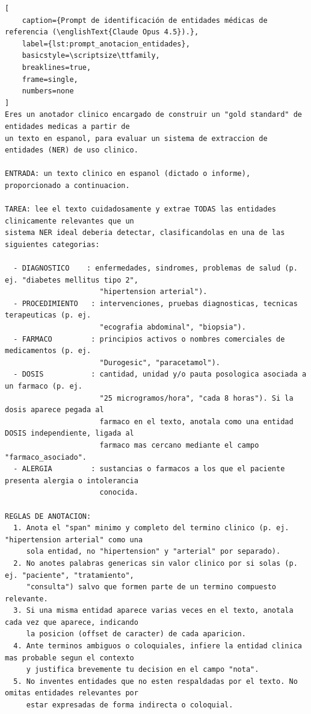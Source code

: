 \begin{lstlisting}[
    caption={Prompt de identificación de entidades médicas de referencia (\englishText{Claude Opus 4.5}).},
    label={lst:prompt_anotacion_entidades},
    basicstyle=\scriptsize\ttfamily,
    breaklines=true,
    frame=single,
    numbers=none
]
Eres un anotador clinico encargado de construir un "gold standard" de entidades medicas a partir de
un texto en espanol, para evaluar un sistema de extraccion de entidades (NER) de uso clinico.

ENTRADA: un texto clinico en espanol (dictado o informe), proporcionado a continuacion.

TAREA: lee el texto cuidadosamente y extrae TODAS las entidades clinicamente relevantes que un
sistema NER ideal deberia detectar, clasificandolas en una de las siguientes categorias:

  - DIAGNOSTICO    : enfermedades, sindromes, problemas de salud (p. ej. "diabetes mellitus tipo 2",
                      "hipertension arterial").
  - PROCEDIMIENTO   : intervenciones, pruebas diagnosticas, tecnicas terapeuticas (p. ej.
                      "ecografia abdominal", "biopsia").
  - FARMACO         : principios activos o nombres comerciales de medicamentos (p. ej.
                      "Durogesic", "paracetamol").
  - DOSIS           : cantidad, unidad y/o pauta posologica asociada a un farmaco (p. ej.
                      "25 microgramos/hora", "cada 8 horas"). Si la dosis aparece pegada al
                      farmaco en el texto, anotala como una entidad DOSIS independiente, ligada al
                      farmaco mas cercano mediante el campo "farmaco_asociado".
  - ALERGIA         : sustancias o farmacos a los que el paciente presenta alergia o intolerancia
                      conocida.

REGLAS DE ANOTACION:
  1. Anota el "span" minimo y completo del termino clinico (p. ej. "hipertension arterial" como una
     sola entidad, no "hipertension" y "arterial" por separado).
  2. No anotes palabras genericas sin valor clinico por si solas (p. ej. "paciente", "tratamiento",
     "consulta") salvo que formen parte de un termino compuesto relevante.
  3. Si una misma entidad aparece varias veces en el texto, anotala cada vez que aparece, indicando
     la posicion (offset de caracter) de cada aparicion.
  4. Ante terminos ambiguos o coloquiales, infiere la entidad clinica mas probable segun el contexto
     y justifica brevemente tu decision en el campo "nota".
  5. No inventes entidades que no esten respaldadas por el texto. No omitas entidades relevantes por
     estar expresadas de forma indirecta o coloquial.


\end{lstlisting}
